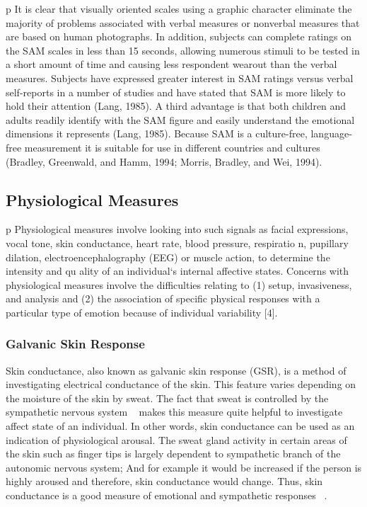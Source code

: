 \documentclass{uofsthesis-cs}
\begin{document}
p It is clear that visually oriented scales using a graphic character eliminate the majority of problems associated with verbal measures or nonverbal measures that are based on human photographs. In addition, subjects can complete ratings on the SAM scales in less than 15 seconds, allowing numerous stimuli to be tested in a short amount of time and causing less respondent wearout than the verbal measures. Subjects have expressed greater interest in SAM ratings versus verbal self-reports in a number of studies and have stated that SAM is more likely to hold their attention (Lang, 1985). A third advantage is that both children and adults readily identify with the SAM figure and easily understand the emotional dimensions it represents (Lang, 1985). Because SAM is a culture-free, language-free measurement it is suitable for use in different countries and cultures (Bradley, Greenwald, and Hamm, 1994; Morris, Bradley, and Wei, 1994).


\subsection{Physiological Measures}

p Physiological measures involve looking into such signals as facial expressions, vocal tone, skin conductance, heart rate, blood pressure, respiratio n, pupillary dilation, electroencephalography (EEG) or muscle action, to determine the intensity and qu ality of an individual‘s internal affective states. Concerns with physiological measures involve the difficulties relating to (1) setup, invasiveness, and analysis and (2) the association of specific physical responses with a particular type of emotion because of individual variability [4].

\subsubsection{Galvanic Skin Response}
Skin conductance, also known as galvanic skin response (GSR), is a method of investigating electrical conductance of the skin. This feature varies depending on the moisture of the skin by sweat. The fact that sweat is controlled by the sympathetic nervous system ~\cite{seiger2002essentials} makes this measure quite helpful to investigate affect state of an individual. In other words, skin conductance can be used as an indication of physiological arousal. The sweat gland activity in certain areas of the skin such as finger tips is largely dependent to sympathetic branch of the autonomic nervous system; And for example it would be increased if the person is highly aroused and therefore, skin conductance would change. Thus, skin conductance is a good measure of emotional and sympathetic responses ~\cite{carlson2013physiology}.
\end{document}
